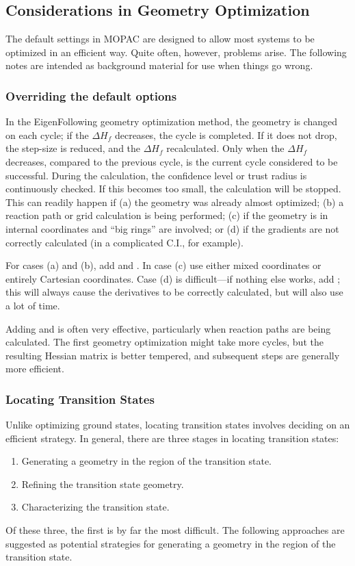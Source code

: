 \subsection{Considerations in Geometry Optimization}
The default settings in MOPAC are designed to allow most systems to be
optimized in an efficient way.  Quite often, however, problems arise.  The
following  notes are intended as background material for use when things go
wrong.

\subsubsection{Overriding the default options}
In the EigenFollowing geometry optimization method, the geometry is changed on
each cycle; if the $\Delta H_f$ decreases, the cycle is completed.  If it does
not drop, the step-size is reduced, and the $\Delta H_f$ recalculated.  Only
when the $\Delta H_f$ decreases, compared to the previous cycle, is the current
cycle considered to be successful.  During the calculation, the confidence
level or trust radius is continuously checked.  If this becomes too small, the
calculation will be stopped.  This can readily happen if (a) the geometry was
already almost  optimized; (b) a reaction path or grid calculation is being
performed; (c) if the geometry is in internal coordinates and ``big rings'' are
involved; or (d) if the  gradients are not correctly calculated (in a
complicated C.I., for example).

For cases (a) and (b), add  and .  In case (c) use
either mixed coordinates or entirely Cartesian coordinates. Case (d) is
difficult---if nothing else works, add ; this will always cause
the derivatives to be correctly calculated, but will also use a lot of time.

Adding  and  is often very effective, particularly when
reaction paths are being calculated.  The first geometry optimization might
take more cycles, but the resulting Hessian matrix is better tempered, and
subsequent steps are generally more efficient.

\subsubsection{Locating Transition States}
Unlike optimizing ground states, locating transition states involves deciding on 
an efficient strategy.  In general, there are three stages in locating 
transition states:
\begin{enumerate}
\item Generating a geometry in the region of the transition state.
\item Refining the transition state geometry.
\item Characterizing the transition state.
\end{enumerate}
Of these three, the first is by far the most difficult.  The following 
approaches are suggested as potential strategies for generating a geometry in 
the region of the transition state.

